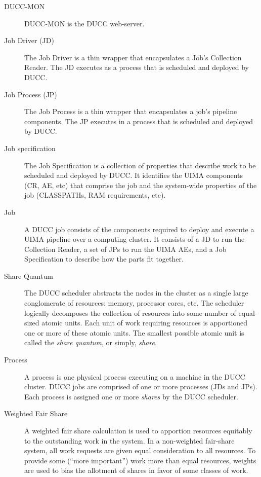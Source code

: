 \begin{description}
\item[DUCC-MON]  DUCC-MON is the DUCC web-server.

\item[Job Driver (JD)]The Job Driver is a thin wrapper that encapsulates a Job's Collection
  Reader. The JD executes as a process that is scheduled and deployed by DUCC.

\item[Job Process (JP)] The Job Process is a thin wrapper that encapsulates a job's pipeline
  components. The JP executes in a process that is scheduled and deployed by DUCC.

\item[Job specification] The Job Specification is a collection of properties that describe work to be
  scheduled and deployed by DUCC. It
  identifies the UIMA components (CR, AE, etc) that comprise the job and the system-wide
  properties of the job (CLASSPATHs, RAM requirements, etc). 

\item[Job] A DUCC job consists of the components required to deploy and execute a UIMA pipeline over
  a computing cluster. It consists of a JD to run the Collection Reader, a set of JPs to run the UIMA
  AEs, and a Job Specification to describe how the parts fit together.

\item[Share Quantum] The DUCC scheduler abstracts the nodes in the cluster as a single large
  conglomerate of resources: memory, processor cores, etc.  The scheduler logically decomposes 
  the collection of resources into some number of equal-sized atomic units.  Each unit of work requiring
  resources is apportioned one or more of these atomic units.  The smallest possible atomic 
  unit is called the {\em share quantum}, or simply, {\em share}.

\item[Process]A process is one physical process executing on a machine in the DUCC cluster. DUCC
  jobs are comprised of one or more processes (JDs and JPs).  Each process is assigned one or
  more {\em shares} by the DUCC scheduler.

\item[Weighted Fair Share] A weighted fair share calculation is used to apportion resources
  equitably to the outstanding work in the system.  In a non-weighted fair-share system, all
  work requests are given equal consideration to all resources.  To provide some (``more important'')
  work more than equal resources, weights are used to bias the allotment of shares in favor of
  some classes of work.


\end{description}

